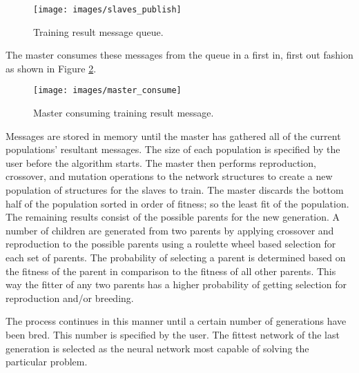 \begin{figure}[htb!]
  \centering
  \texttt{[image: images/slaves\_publish]}
  \caption{Training result message queue.}
  \label{slaves_publish}
\end{figure}

The master consumes these messages from the queue in a first in, first out fashion as shown in Figure \ref{master_consume}.

\begin{figure}[htb!]
  \centering
  \texttt{[image: images/master\_consume]}
  \caption{Master consuming training result message.}
  \label{master_consume}
\end{figure}

Messages are stored in memory until the master has gathered all of the current populations' resultant messages. 
The size of each population is specified by the user before the algorithm starts.
The master then performs reproduction, crossover, and mutation operations to the network structures to create a new population of structures for the slaves to train.
The master discards the bottom half of the population sorted in order of fitness; so the least fit of the population. 
The remaining results consist of the possible parents for the new generation. 
A number of children are generated from two parents by applying crossover and reproduction to the possible parents using a roulette wheel based selection for each set of parents. 
The probability of selecting a parent is determined based on the fitness of the parent in comparison to the fitness of all other parents. 
This way the fitter of any two parents has a higher probability of getting selection for reproduction and/or breeding.

The process continues in this manner until a certain number of generations have been bred. 
This number is specified by the user. 
The fittest network of the last generation is selected as the neural
network most capable of solving the particular problem.

